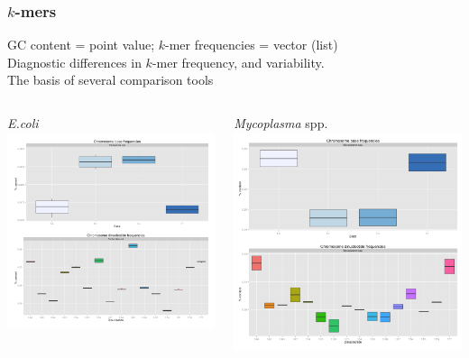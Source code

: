 \begin{frame}
  \frametitle{$k$-mers}
  GC content = point value; $k$-mer frequencies = vector (list)\\[0.2cm]
  Diagnostic differences in $k$-mer frequency, and variability.\\[0.2cm]
  The basis of several comparison tools
  \begin{columns}[T]
    \begin{column}{5cm}
    \textit{E.coli}\\
     \includegraphics[width=1\textwidth]{images/kmer_ecoli}\\
    \end{column}
    \begin{column}{5cm}     
     \textit{Mycoplasma} spp.
     \includegraphics[width=1\textwidth]{images/kmer_mycoplasma}\\

\end{column}
\end{columns}
\end{frame}

